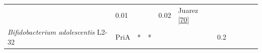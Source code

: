 \documentclass[12pt,twoside]{reedthesis}
\begin{document}
\begin{longtable}[]{@{}lllllllllll@{}}
\begin{minipage}[t]{0.06\columnwidth}
  \strut
  \end{minipage} & \begin{minipage}[t]{0.06\columnwidth}\raggedright\strut
  0.01\strut
  \end{minipage} & \begin{minipage}[t]{0.05\columnwidth}\raggedright\strut
  \strut
  \end{minipage} & \begin{minipage}[t]{0.05\columnwidth}\raggedright\strut
  \strut
  \end{minipage} & \begin{minipage}[t]{0.03\columnwidth}\raggedright\strut
  0.02\strut
  \end{minipage} & \begin{minipage}[t]{0.11\columnwidth}\raggedright\strut
  Juarez
  {[}\protect\hyperlink{ref-juarez-vazquez_evolution_2017}{70}{]}\strut
  \end{minipage}\tabularnewline
  \begin{minipage}[t]{0.15\columnwidth}\raggedright\strut
  \emph{Bifidobacterium adolescentis} L2-32\strut
  \end{minipage} & \begin{minipage}[t]{0.05\columnwidth}\raggedright\strut
  PriA\strut
  \end{minipage} & \begin{minipage}[t]{0.04\columnwidth}\raggedright\strut
  *\strut
  \end{minipage} & \begin{minipage}[t]{0.04\columnwidth}\raggedright\strut
  *\strut
  \end{minipage} & \begin{minipage}[t]{0.06\columnwidth}\raggedright\strut
  \strut
  \end{minipage} & \begin{minipage}[t]{0.06\columnwidth}\raggedright\strut
  \strut
  \end{minipage} & \begin{minipage}[t]{0.06\columnwidth}\raggedright\strut
  0.2\strut
  \end{minipage} & \begin{minipage}[t]{0.05\columnwidth}\raggedright\strut
  \strut
  \end{minipage} & \begin{minipage}[t]{0.05\columnwidth}\raggedright\strut
  \strut
  \end{minipage} & \begin{minipage}[t]{0.03\columnwidth}\raggedright\strut

\end{minipage}
\end{longtable}
\end{document}
